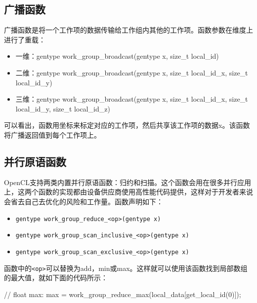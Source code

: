 \subsection{广播函数}

广播函数是将一个工作项的数据传输给工作组内其他的工作项。函数参数在维度上进行了重载：

\begin{itemize}
\item 一维：gentype work\_\allowbreak{}group\_\allowbreak{}broadcast(gentype x, size\_\allowbreak{}t local\_\allowbreak{}id)
\item 二维：gentype work\_\allowbreak{}group\_\allowbreak{}broadcast(gentype x, size\_\allowbreak{}t local\_\allowbreak{}id\_\allowbreak{}x, size\_\allowbreak{}t local\_\allowbreak{}id\_\allowbreak{}y)
\item 三维：gentype work\_\allowbreak{}group\_\allowbreak{}broadcast(gentype x, size\_\allowbreak{}t local\_\allowbreak{}id\_\allowbreak{}x, size\_\allowbreak{}t local\_\allowbreak{}id\_\allowbreak{}y, size\_\allowbreak{}t local\_\allowbreak{}id\_\allowbreak{}z)
\end{itemize}

可以看出，函数用坐标来标定对应的工作项，然后共享该工作项的数据x。该函数将广播返回值到每个工作项上。

\subsection{并行原语函数}

OpenCL支持两类内置并行原语函数：归约和扫描。这个函数会用在很多并行应用上，这两个函数的实现都由设备供应商使用高性能代码提供，这样对于开发者来说会省去自己去优化的风险和工作量。函数声明如下：

\begin{itemize}
\item \texttt{gentype work\_group\_reduce\_\textless{}op\textgreater{}(gentype x)}
\item \texttt{gentype work\_group\_scan\_inclusive\_\textless{}op\textgreater{}(gentype x)}
\item \texttt{gentype work\_group\_scan\_exclusive\_\textless{}op\textgreater{}(gentype x)}
\end{itemize}

函数中的\texttt{\textless{}op\textgreater{}}可以替换为add，min或max。这样就可以使用该函数找到局部数组的最大值，就如下面的代码所示：

\begin{codebox}[cpp]
// float max:
max = work_group_reduce_max(local_data[get_local_id(0)]);
\end{codebox}

